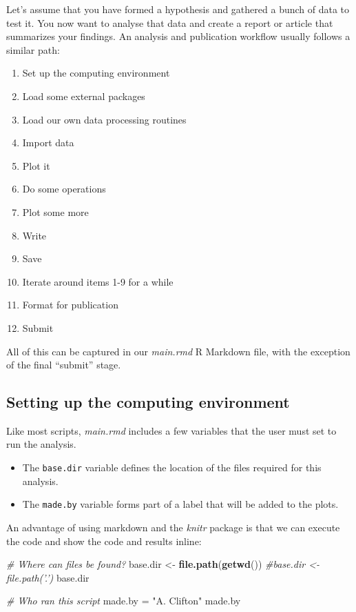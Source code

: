 \documentclass[11pt,]{article}
\newenvironment{Shaded}{\begin{snugshade}}{\end{snugshade}}
\newcommand{\CommentTok}[1]{\textcolor[rgb]{0.56,0.35,0.01}{\textit{#1}}}
\newcommand{\KeywordTok}[1]{\textcolor[rgb]{0.13,0.29,0.53}{\textbf{#1}}}
\newcommand{\NormalTok}[1]{#1}
\newcommand{\StringTok}[1]{\textcolor[rgb]{0.31,0.60,0.02}{#1}}
\providecommand{\tightlist}{%
  \setlength{\itemsep}{0pt}\setlength{\parskip}{0pt}}
\begin{document}
Let's assume that you have formed a hypothesis and gathered a bunch of data to test it. You now want to analyse that data and create a report or article that summarizes your findings. An analysis and publication workflow usually follows a similar path:

\begin{enumerate}
\def\labelenumi{\arabic{enumi}.}
\tightlist
\item
  Set up the computing environment
\item
  Load some external packages
\item
  Load our own data processing routines
\item
  Import data
\item
  Plot it
\item
  Do some operations
\item
  Plot some more
\item
  Write
\item
  Save
\item
  Iterate around items 1-9 for a while
\item
  Format for publication
\item
  Submit
\end{enumerate}

All of this can be captured in our \emph{main.rmd} R Markdown file, with the exception of the final ``submit'' stage.

\hypertarget{setting-up-the-computing-environment}{%
\subsection{Setting up the computing environment}\label{setting-up-the-computing-environment}}

Like most scripts, \emph{main.rmd} includes a few variables that the user must set to run the analysis.

\begin{itemize}
\tightlist
\item
  The \texttt{base.dir} variable defines the location of the files required for this analysis.
\item
  The \texttt{made.by} variable forms part of a label that will be added to the plots.
\end{itemize}

An advantage of using markdown and the \emph{knitr} package is that we can execute the code and show the code and results inline:

\begin{Shaded}
\begin{Highlighting}[]
\CommentTok{# Where can files be found?}
\NormalTok{base.dir <-}\StringTok{ }\KeywordTok{file.path}\NormalTok{(}\KeywordTok{getwd}\NormalTok{())}
\CommentTok{#base.dir <-file.path('.')}
\NormalTok{base.dir}

\CommentTok{# Who ran this script}
\NormalTok{made.by =}\StringTok{ "A. Clifton"}
\NormalTok{made.by}
\end{Highlighting}
\end{Shaded}
\end{document}
